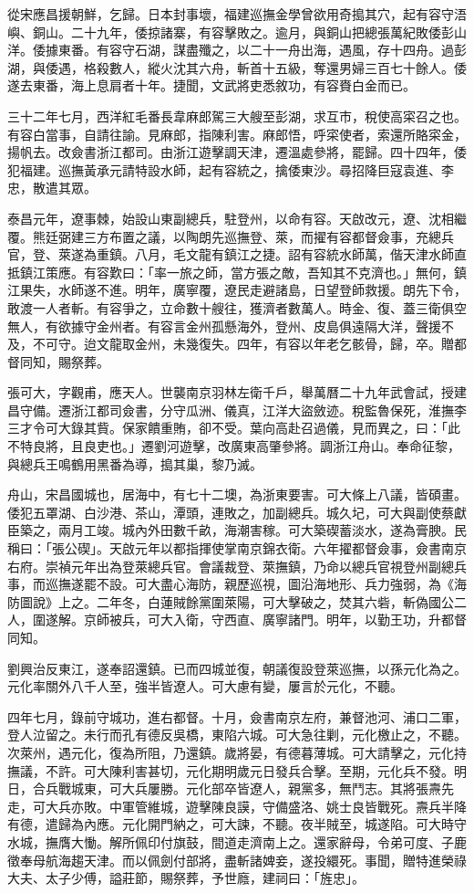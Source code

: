 \begin{pinyinscope}
從宋應昌援朝鮮，乞歸。日本封事壞，福建巡撫金學曾欲用奇搗其穴，起有容守浯嶼、銅山。二十九年，倭掠諸寨，有容擊敗之。逾月，與銅山把總張萬紀敗倭彭山洋。倭據東番。有容守石湖，謀盡殲之，以二十一舟出海，遇風，存十四舟。過彭湖，與倭遇，格殺數人，縱火沈其六舟，斬首十五級，奪還男婦三百七十餘人。倭遂去東番，海上息肩者十年。捷聞，文武將吏悉敘功，有容賚白金而已。

三十二年七月，西洋紅毛番長韋麻郎駕三大艘至彭湖，求互市，稅使高寀召之也。有容白當事，自請往諭。見麻郎，指陳利害。麻郎悟，呼寀使者，索還所賂寀金，揚帆去。改僉書浙江都司。由浙江遊擊調天津，遷溫處參將，罷歸。四十四年，倭犯福建。巡撫黃承元請特設水師，起有容統之，擒倭東沙。尋招降巨寇袁進、李忠，散遣其眾。

泰昌元年，遼事棘，始設山東副總兵，駐登州，以命有容。天啟改元，遼、沈相繼覆。熊廷弼建三方布置之議，以陶朗先巡撫登、萊，而擢有容都督僉事，充總兵官，登、萊遂為重鎮。八月，毛文龍有鎮江之捷。詔有容統水師萬，偕天津水師直抵鎮江策應。有容歎曰：「率一旅之師，當方張之敵，吾知其不克濟也。」無何，鎮江果失，水師遂不進。明年，廣寧覆，遼民走避諸島，日望登師救援。朗先下令，敢渡一人者斬。有容爭之，立命數十艘往，獲濟者數萬人。時金、復、蓋三衛俱空無人，有欲據守金州者。有容言金州孤懸海外，登州、皮島俱遠隔大洋，聲援不及，不可守。迨文龍取金州，未幾復失。四年，有容以年老乞骸骨，歸，卒。贈都督同知，賜祭葬。

張可大，字觀甫，應天人。世襲南京羽林左衛千戶，舉萬曆二十九年武會試，授建昌守備。遷浙江都司僉書，分守瓜洲、儀真，江洋大盜斂迹。稅監魯保死，淮撫李三才令可大錄其貲。保家饋重賄，卻不受。葉向高赴召過儀，見而異之，曰：「此不特良將，且良吏也。」遷劉河遊擊，改廣東高肇參將。調浙江舟山。奉命征黎，與總兵王鳴鶴用黑番為導，搗其巢，黎乃滅。

舟山，宋昌國城也，居海中，有七十二墺，為浙東要害。可大條上八議，皆碩畫。倭犯五罩湖、白沙港、茶山，潭頭，連敗之，加副總兵。城久圮，可大與副使蔡獻臣築之，兩月工竣。城內外田數千畝，海潮害稼。可大築碶蓄淡水，遂為膏腴。民稱曰：「張公碶」。天啟元年以都指揮使掌南京錦衣衛。六年擢都督僉事，僉書南京右府。崇禎元年出為登萊總兵官。會議裁登、萊撫鎮，乃命以總兵官視登州副總兵事，而巡撫遂罷不設。可大盡心海防，親歷巡視，圖沿海地形、兵力強弱，為《海防圖說》上之。二年冬，白蓮賊餘黨圍萊陽，可大擊破之，焚其六砦，斬偽國公二人，圍遂解。京師被兵，可大入衛，守西直、廣寧諸門。明年，以勤王功，升都督同知。

劉興治反東江，遂奉詔還鎮。已而四城並復，朝議復設登萊巡撫，以孫元化為之。元化率關外八千人至，強半皆遼人。可大慮有變，屢言於元化，不聽。

四年七月，錄前守城功，進右都督。十月，僉書南京左府，兼督池河、浦口二軍，登人泣留之。未行而孔有德反吳橋，東陷六城。可大急往剿，元化檄止之，不聽。次萊州，遇元化，復為所阻，乃還鎮。歲將晏，有德暮薄城。可大請擊之，元化持撫議，不許。可大陳利害甚切，元化期明歲元日發兵合擊。至期，元化兵不發。明日，合兵戰城東，可大兵屢勝。元化部卒皆遼人，親黨多，無鬥志。其將張燾先走，可大兵亦敗。中軍管維城，遊擊陳良謨，守備盛洛、姚士良皆戰死。燾兵半降有德，遣歸為內應。元化開門納之，可大諫，不聽。夜半賊至，城遂陷。可大時守水城，撫膺大慟。解所佩印付旗鼓，間道走濟南上之。還家辭母，令弟可度、子鹿徵奉母航海趨天津。而以佩劍付部將，盡斬諸婢妾，遂投繯死。事聞，贈特進榮祿大夫、太子少傅，謚莊節，賜祭葬，予世廕，建祠曰：「旌忠」。


\end{pinyinscope}
